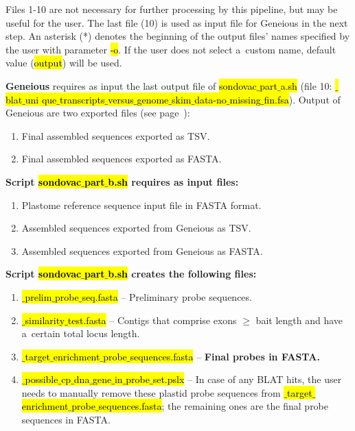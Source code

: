 \documentclass[a4paper, 11pt, twoside]{article}
\renewcommand{\texttt}[1]{\hl{\ttfamily #1}}
\begin{document}
Files 1-10 are not necessary for further processing by this pipeline, but may be useful for the user. The last file (10) is used as input file for Geneious in the next step. An asterisk (*) denotes the beginning of the output files' names specified by the user with parameter \texttt{-o}. If the user does not select a~custom name, default value (\texttt{output}) will be used.

\textbf{Geneious} requires as input the last output file of \texttt{sondovac$\_$part$\_$a.sh} (file 10: \texttt{*$\_$blat$\_$uni\- que$\_$transcripts$\_$versus$\_$genome$\_$skim$\_$data-no$\_$missing$\_$fin.fsa}). Output of Geneious are two exported files (see page~\pageref{geneious-usage}):

\begin{enumerate}
  \item Final assembled sequences exported as TSV.
  \item Final assembled sequences exported as FASTA.
\end{enumerate}

\textbf{Script \texttt{sondovac$\_$part$\_$b.sh} requires as input files:}

\begin{enumerate}
  \item Plastome reference sequence input file in FASTA format.
  \item Assembled sequences exported from Geneious as TSV.
  \item Assembled sequences exported from Geneious as FASTA.
\end{enumerate}

\textbf{Script \texttt{sondovac$\_$part$\_$b.sh} creates the following files:}

\begin{enumerate}
  \item \texttt{*$\_$prelim$\_$probe$\_$seq.fasta} -- Preliminary probe sequences.
  \item \texttt{*$\_$similarity$\_$test.fasta} -- Contigs that comprise exons $\geq$ bait length and have a~certain total locus length.
  \item \texttt{*$\_$target$\_$enrichment$\_$probe$\_$sequences.fasta} -- \textbf{Final probes in FASTA.}
  \item \texttt{*$\_$possible$\_$cp$\_$dna$\_$gene$\_$in$\_$probe$\_$set.pslx} -- In case of any BLAT hits, the user needs to manually remove these plastid probe sequences from \texttt{*$\_$target$\_$enrichment$\_$probe$\_$se\-quences.fasta}; the remaining ones are the final probe sequences in FASTA.
\end{enumerate}
\end{document}
